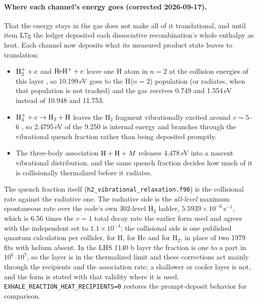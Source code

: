 \paragraph{Where each channel's energy goes (corrected 2026-09-17).}
That the energy stays in the gas does not make all of it translational, and
until item L7g the ledger deposited each dissociative recombination's whole
enthalpy as heat. Each channel now deposits what its measured product state
leaves to translation:
\begin{itemize}
\item ${\rm H_2^+}+e$ and ${\rm HeH^+}+e$ leave one H atom in $n=2$ at the
  collision energies of this layer \citep{Takagi2002,GiustiSuzor1983,Guberman1994},
  so 10.199\,eV goes to the H($n=2$) population (or radiates, when that
  population is not tracked) and the gas receives 0.749 and 1.554\,eV instead
  of 10.948 and 11.753.
\item ${\rm H_3^+}+e \to {\rm H_2}+{\rm H}$ leaves the H$_2$ fragment
  vibrationally excited around $v=5$--6 \citep{Kokoouline2001,Strasser2001}, so
  2.4795\,eV of the 9.250 is internal energy and branches through the
  vibrational quench fraction rather than being deposited promptly.
\item The three-body association ${\rm H}+{\rm H}+M$ releases 4.478\,eV into
  a nascent vibrational distribution, and the same quench fraction decides how
  much of it is collisionally thermalized before it radiates.
\end{itemize}
The quench fraction itself (\texttt{h2\_vibrational\_relaxation.f90}) is the
collisional rate against the radiative one. The radiative side is the
\emph{all-level} maximum spontaneous rate over the code's own 302-level
H$_2$ ladder, $5.5939\times10^{-6}$\,s$^{-1}$, which is 6.56 times the $v=1$
total decay rate the earlier form used and agrees with the independent
\citet{Wolniewicz1998} set to $1.1\times10^{-4}$; the collisional side is one
published quantum calculation per collider, \citet{Lique2015} for H,
\citet{Jozwiak2024} for He and \citet{LeBourlot1999} for H$_2$, in place of
two 1979 fits with helium absent. In the LHS 1140 b layer the fraction is one
to a part in $10^{6}$--$10^{7}$, so the layer is in the thermalized limit and
these corrections act mainly through the recipients and the association rate;
a shallower or cooler layer is not, and the form is stated with that validity
where it is used. \texttt{EXHALE\_REACTION\_HEAT\_RECIPIENTS=0} restores the
prompt-deposit behavior for comparison.

